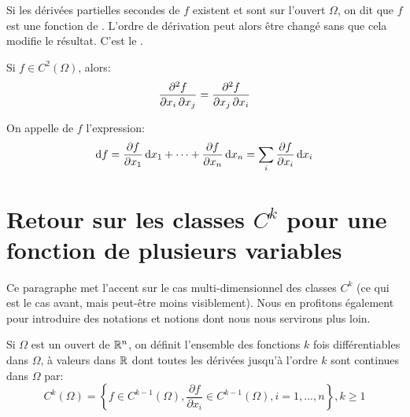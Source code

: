 Si  les dérivées partielles secondes de $f$ existent et sont 
sur l'ouvert $\Omega$, on dit que $f$ est une fonction de .
L'ordre de dérivation peut alors être changé sans que cela modifie le résultat.
C'est le .
\begin{theoreme}
Si $f\in C^2(\Omega)$, alors:
\begin{equation}\colorred
    \frac{\partial^2f}{\partial x_i\, \partial x_j} = \frac{\partial^2f} {\partial x_j\, \partial x_i}
\end{equation}
\end{theoreme}

\begin{definition}
On appelle  de $f$ l'expression:
\begin{equation}
    \text{d} f=\frac{\partial f}{\partial x_1}\,\text{d} x_1+\cdots+\frac{\partial f}{\partial x_n}\,\text{d} x_n
=   \displaystyle\sum_i \frac{\partial f}{\partial x_i}\,\text{d} x_i
\end{equation}
\end{definition}

\medskip
\section{Retour sur les classes $C^k$ pour une fonction de plusieurs variables}

Ce paragraphe met l'accent sur le cas multi-dimensionnel des classes $C^k$
(ce qui est le cas avant, mais peut-être moins visiblement).
Nous en profitons également pour introduire des notations et notions dont nous
nous servirons plus loin.

\medskip
\begin{definition}
Si $\Omega$ est un ouvert de $\mathbb R^n$, on définit l'ensemble des
fonctions $k$ fois différentiables dans $\Omega$, à valeurs
dans $\mathbb R$ dont toutes les dérivées jusqu'à l'ordre $k$ sont continues dans
$\Omega$ par:
\begin{equation}
C^k(\Omega) = \left\{f\in C^{k-1}(\Omega), \dfrac{\partial f}{\partial x_i}\in C^{k-1}(\Omega),
i=1, ..., n\right\}, k\ge 1
\end{equation}
\end{definition}

